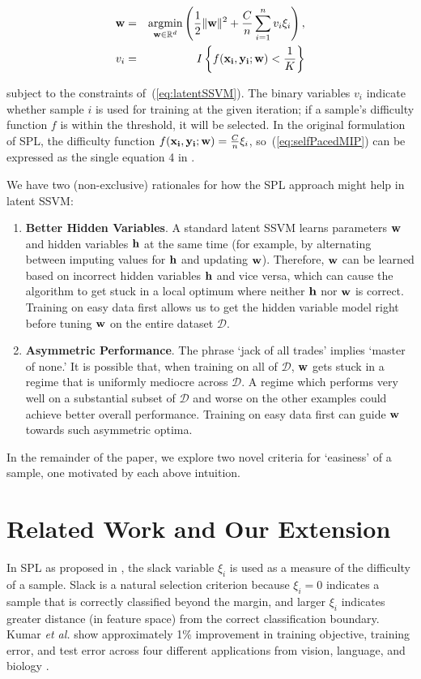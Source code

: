 \documentclass{article}
\newcommand{\mysection}[1]{\vspace{-4mm}\section{#1}\vspace{-4mm}}
\newcommand{\argmin}{\operatornamewithlimits{argmin}}
\begin{document}
\begin{eqnarray}
{\bf w} &=& \argmin_{{\bf w} \in \mathbb{R}^d}
\left(\frac{1}{2}\|{\bf w}\|^2 + \frac{C}{n}\sum_{i=1}^n v_i \xi_i\right), \nonumber \\
{v}_i &=& I \left\{ f({\bf x_i},{\bf y_i};{\bf w}) < \frac{1}{K} \right\}
\label{eq:selfPacedMIP}
\end{eqnarray}

subject to the constraints of~(\ref{eq:latentSSVM}). The binary variables $v_i$ indicate whether sample $i$ is used for training at the given iteration; if a sample's difficulty function $f$ is within the threshold, it will be selected.  In the original formulation of SPL, the difficulty function $f({\bf x_i, \bf y_i; \bf w}) = \frac{C}{n}\xi_i$, so~(\ref{eq:selfPacedMIP}) can be expressed as the single equation 4 in \cite{SPL}.

We have two (non-exclusive) rationales for how the SPL approach might help in latent SSVM:

\begin{enumerate}
\item \textbf{Better Hidden Variables}.  A standard latent SSVM learns parameters $\bf w$ and hidden variables $\bf h$ at the same time (for example, by alternating between imputing values for $\bf h$ and updating $\bf w$).  Therefore, $\bf w$ can be learned based on incorrect hidden variables $\bf h$ and vice versa, which can cause the algorithm to get stuck in a local optimum where neither $\bf h$ nor $\bf w$ is correct. Training on easy data first allows us to get the hidden variable model right before tuning $\bf w$ on the entire dataset $\mathcal D$.
\item \textbf{Asymmetric Performance}. The phrase `jack of all trades' implies `master of none.'  It is possible that, when training on all of $\mathcal D$, $\bf w$ gets stuck in a regime that is uniformly mediocre across $\mathcal D$. A regime which performs very well on a substantial subset of $\mathcal D$ and worse on the other examples could achieve better overall performance. Training on easy data first can guide $\bf w$ towards such asymmetric optima.
\end{enumerate}

In the remainder of the paper, we explore two novel criteria for `easiness' of a sample, one motivated by each above intuition.

\mysection{Related Work and Our Extension}
\label{sec:related}
In SPL as proposed in \cite{SPL}, the slack variable $\xi_i$ is used as a measure of the difficulty of a sample.  Slack is a natural selection criterion because $\xi_i=0$ indicates a sample that is correctly classified beyond the margin, and larger $\xi_i$ indicates greater distance (in feature space) from the correct classification boundary. Kumar \textit{et al.} show approximately 1\% improvement in training objective, training error, and test error across four different applications from vision, language, and biology \cite{SPL}.
\end{document}
